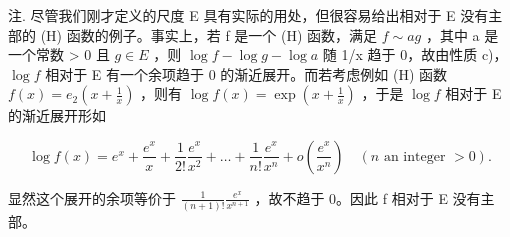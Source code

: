 注. 尽管我们刚才定义的尺度 E 具有实际的用处，但很容易给出相对于 E 没有主部的 (H) 函数的例子。事实上，若 f 是一个 (H) 函数，满足 \(f \sim ag\) ，其中 a 是一个常数 \textgreater{} 0 且 \(g \in E\) ，则 \(\log f - \log g - \log a\) 随 1/x 趋于 0，故由性质 c)， \(\log f\) 相对于 E 有一个余项趋于 0 的渐近展开。而若考虑例如 (H) 函数 \(f(x) = e_{2}\left(x + \frac{1}{x}\right)\) ，则有 \(\log f(x) = \exp\left(x + \frac{1}{x}\right)\) ，于是 \(\log f\) 相对于 E 的渐近展开形如

\[
\log f (x) = e ^ {x} + \frac {e ^ {x}}{x} + \frac {1}{2 !} \frac {e ^ {x}}{x ^ {2}} + \dots + \frac {1}{n !} \frac {e ^ {x}}{x ^ {n}} + o \left(\frac {e ^ {x}}{x ^ {n}}\right) \quad (n \text {   an   integer   } > 0).
\]

显然这个展开的余项等价于 \(\frac{1}{(n+1)!}\frac{e^{x}}{x^{n+1}}\) ，故不趋于 0。因此 f 相对于 E 没有主部。

